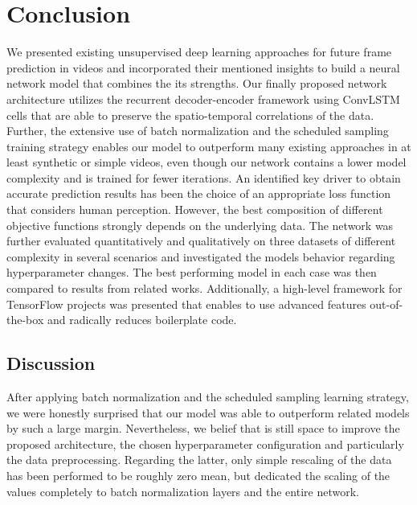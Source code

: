 
\chapter{Conclusion} \label{chapter:conclusion}

We presented existing unsupervised deep learning approaches for future frame prediction in videos and incorporated their mentioned insights to build a neural network model that combines the its strengths. Our finally proposed network architecture utilizes the recurrent decoder-encoder framework using ConvLSTM cells that are able to preserve the spatio-temporal correlations of the data. Further, the extensive use of batch normalization and the scheduled sampling training strategy enables our model to outperform many existing approaches in at least synthetic or simple videos, even though our network contains a lower model complexity and is trained for fewer iterations. An identified key driver to obtain accurate prediction results has been the choice of an appropriate loss function that considers human perception. However, the best composition of different objective functions strongly depends on the underlying data. The network was further evaluated quantitatively and qualitatively on three datasets of different complexity in several scenarios and investigated the models behavior regarding hyperparameter changes. The best performing model in each case was then compared to results from related works. Additionally, a high-level framework for TensorFlow projects was presented that enables to use advanced features out-of-the-box and radically reduces boilerplate code.

\section{Discussion}

After applying batch normalization and the scheduled sampling learning strategy, we were honestly surprised that our model was able to outperform related models by such a large margin. Nevertheless, we belief that is still space to improve the proposed architecture, the chosen hyperparameter configuration and particularly the data preprocessing. Regarding the latter, only simple rescaling of the data has been performed to be roughly zero mean, but dedicated the scaling of the values completely to batch normalization layers and the entire network.

